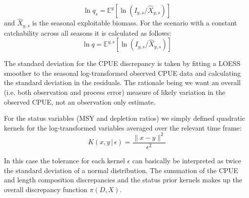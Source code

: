 \documentclass[11pt]{article}
\newcommand{\wh}{\widehat}
\newcommand{\ds}{\displaystyle}
\newcommand{\eps}{\epsilon}
\begin{document}
\begin{equation*}
    \ds \ln q_s = \mathbb{E}^y\left[\ln\left(I_{y,s}/\wh{X}_{y,s}\right)\right]
\end{equation*}
and $\wh{X}_{y,s}$ is the seasonal exploitable biomass. For the scenario with a constant catchability across all seasons it is calculated as follows:
\begin{equation*}
    \ds \ln q = \mathbb{E}^{y,s}\left[\ln\left(I_{y,s}/\wh{X}_{y,s}\right)\right]
\end{equation*}

The standard deviation for the CPUE discrepancy is taken by fitting a LOESS smoother to the seasonal log-transformed observed CPUE data and calculating the standard deviation in the residuals. The rationale being we want an overall (i.e. both observation and process error) measure of likely variation in the observed CPUE, not an observation only estimate.

For the status variables (MSY and depletion ratios) we simply defined quadratic kernels for the log-transformed variables averaged over the relevant time frame:
\begin{equation*}
    \ds K(x,y\,|\,\eps) = \frac{\parallel x-y\parallel^2}{\eps^2}
\end{equation*}

In this case the tolerance for each kernel $\eps$ can basically be interpreted as twice the standard deviation of a normal distribution. The summation of the CPUE and length composition discrepancies and the status prior kernels makes up the overall discrepancy function $\pi(D,X)$.

\end{document}
